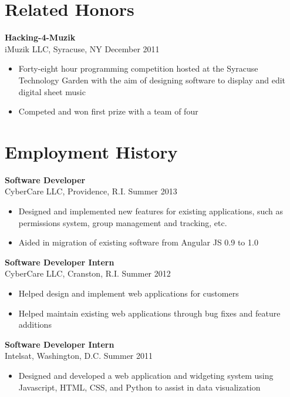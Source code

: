 \documentclass[margin]{res}
\begin{document}
\begin{resume}
\section{Related Honors}
{\bf Hacking-4-Muzik}\\iMuzik LLC, Syracuse, NY \hfill December 2011
\begin{itemize}
\item Forty-eight hour programming competition hosted at the Syracuse Technology Garden with the aim of designing software to display and edit digital sheet music
\item Competed and won first prize with a team of four
\end{itemize}

\section{Employment History}
{\bf Software Developer} \\CyberCare LLC, Providence, R.I. \hfill Summer 2013
\begin{itemize}
\item Designed and implemented new features for existing applications, such as permissions system, group management and tracking, etc.
\item Aided in migration of existing software from Angular JS 0.9 to 1.0
\end{itemize}
{\bf Software Developer Intern}\\CyberCare LLC, Cranston, R.I. \hfill Summer 2012
\begin{itemize}
\item Helped design and implement web applications for customers
\item Helped maintain existing web applications through bug fixes and feature additions
\end{itemize}
{\bf Software Developer Intern}\\Intelsat, Washington, D.C. \hfill Summer 2011
\begin{itemize}
\item Designed and developed a web application and widgeting system using Javascript, HTML, CSS, and Python to assist in data visualization
\end{itemize}

\end{resume} 
\end{document}
